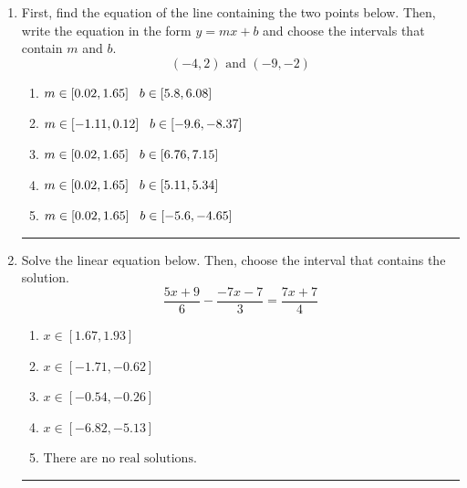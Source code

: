 \documentclass[14pt]{extbook}
\newcommand{\litem}[1]{\item#1\hspace*{-1cm}\rule{\textwidth}{0.4pt}}
\begin{document}
\begin{enumerate}
\litem{
First, find the equation of the line containing the two points below. Then, write the equation in the form $ y=mx+b $ and choose the intervals that contain $m$ and $b$.\[ (-4, 2) \text{ and } (-9, -2) \]\begin{enumerate}[label=\Alph*.]
\item \( m \in [0.02, 1.65] \hspace*{3mm} b \in [5.8, 6.08] \)
\item \( m \in [-1.11, 0.12] \hspace*{3mm} b \in [-9.6, -8.37] \)
\item \( m \in [0.02, 1.65] \hspace*{3mm} b \in [6.76, 7.15] \)
\item \( m \in [0.02, 1.65] \hspace*{3mm} b \in [5.11, 5.34] \)
\item \( m \in [0.02, 1.65] \hspace*{3mm} b \in [-5.6, -4.65] \)

\end{enumerate} }
\litem{
Solve the linear equation below. Then, choose the interval that contains the solution.\[ \frac{5x + 9}{6} - \frac{-7x -7}{3} = \frac{7x + 7}{4} \]\begin{enumerate}[label=\Alph*.]
\item \( x \in [1.67, 1.93] \)
\item \( x \in [-1.71, -0.62] \)
\item \( x \in [-0.54, -0.26] \)
\item \( x \in [-6.82, -5.13] \)
\item \( \text{There are no real solutions.} \)


\end{enumerate}}
\end{enumerate}
\end{document}
